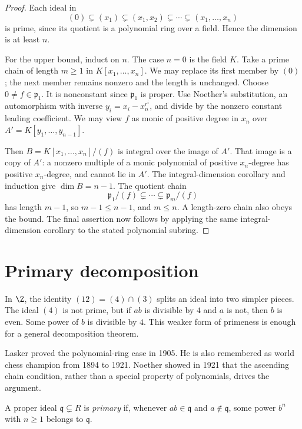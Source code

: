 \begin{proof}
Each ideal in
\[
(0)\subsetneq(x_1)\subsetneq(x_1,x_2)\subsetneq\cdots
 \subsetneq(x_1,\ldots,x_n)
\]
is prime, since its quotient is a polynomial ring over a field. Hence the dimension is at least $n$.

For the upper bound, induct on $n$. The case $n=0$ is the field $K$. Take a prime chain of length $m\ge1$ in $K[x_1,\ldots,x_n]$. We may replace its first member by $(0)$; the next member remains nonzero and the length is unchanged. Choose $0\ne f\in\mathfrak p_1$. It is nonconstant since $\mathfrak p_1$ is proper. Use Noether's substitution, an automorphism with inverse $y_i=x_i-x_n^{r^i}$, and divide by the nonzero constant leading coefficient. We may view $f$ as monic of positive degree in $x_n$ over $A'=K[y_1,\ldots,y_{n-1}]$.

Then $B=K[x_1,\ldots,x_n]/(f)$ is integral over the image of $A'$. That image is a copy of $A'$: a nonzero multiple of a monic polynomial of positive $x_n$-degree has positive $x_n$-degree, and cannot lie in $A'$. The integral-dimension corollary and induction give $\dim B=n-1$. The quotient chain
\[
\mathfrak p_1/(f)\subsetneq\cdots\subsetneq\mathfrak p_m/(f)
\]
has length $m-1$, so $m-1\le n-1$, and $m\le n$. A length-zero chain also obeys the bound. The final assertion now follows by applying the same integral-dimension corollary to the stated polynomial subring.
\end{proof}

\section{Primary decomposition}

In $\Z$, the identity $(12)=(4)\cap(3)$ splits an ideal into two simpler pieces. The ideal $(4)$ is not prime, but if $ab$ is divisible by $4$ and $a$ is not, then $b$ is even. Some power of $b$ is divisible by $4$. This weaker form of primeness is enough for a general decomposition theorem.

Lasker proved the polynomial-ring case in 1905. He is also remembered as world chess champion from 1894 to 1921. Noether showed in 1921 that the ascending chain condition, rather than a special property of polynomials, drives the argument.

\begin{definition}\label{def:primary}
A proper ideal $\mathfrak q\subsetneq R$ is \emph{primary} if, whenever $ab\in\mathfrak q$ and $a\notin\mathfrak q$, some power $b^n$ with $n\ge1$ belongs to $\mathfrak q$.
\end{definition}

